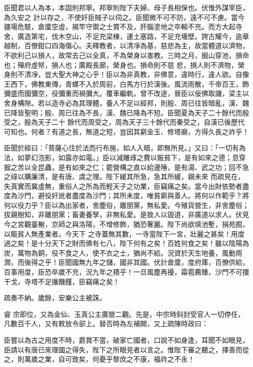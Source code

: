\begin{pinyinscope}
 臣聞君以人為本，本固則邦寧。邦寧則陛下夫婦、母子長相保也。伏惟外謀宰臣，為久安之
 計以存之，不使奸臣賊子以伺之。臣聞微不可不防，遠不可不慮。當今疆場危駭，倉廩空虛，揭竿守禦之士賞不及，肝腦塗地之卒輸不充。而方大起寺舍，廣造第宅，伐木空山，不足充梁棟，運土塞路，不足充墻壁。誇古耀今，逾章越制，百僚鉗口四海傷心。夫釋教者，以清凈為基，慈悲為主，故當體道以濟物，不欲利己以損人，故常去己以全真，不為榮身以害教。三時之月，掘山穿池，損命也；殫府虛帑，損人也；廣殿長廊，榮身也。損命則不慈
 悲，損人則不濟物，榮身則不清凈，豈大聖大神之心乎！臣以為非真教，非佛意，違時行，違人欲。自像王西下，佛教東傳，青螺不入於周前，白馬方行於漢後。風流雨散，千帝百王，飾彌盛而國彌空，役彌重而禍彌大。覆車繼軌，曾不改途，晉臣以佞佛取譏，梁主以舍身構隙。若以造寺必為其理體，養人不足以經邦，則殷、周已往皆暗亂，漢、魏已降皆聖明；殷、周已往為不長，漢、魏已降為不短。臣聞夏為天子二十餘代而殷受之，殷為天子二十
 餘代而周受之，周為天子三十餘代而秦受之，自漢已後歷代可知也。何者？有道之長，無道之短，豈因其窮金玉、修塔廟，方得久長之祚乎！



 臣聞於經曰：「菩薩心住於法而行布施，如人入暗，即無所見。」又曰：「一切有為法，如夢幻泡影，如露亦如電。」臣以減雕琢之費以賑貧下，是有如來之德；息穿掘之苦以全昆蟲，是有如來之仁；罷營構之直以給邊陲，是有湯、武之功；回不急之祿以購廉清，是有唐、虞之理。陛下緩其所急，急其所緩，親未來
 而疏見在，失真實而冀虛無，重俗人之所為而輕天子之功業，臣竊痛之矣。當今出財依勢者盡度為沙門，避役奸訛者盡度為沙門；其所未度，唯貧窮與善人。將何以作範乎？將何以役力乎？臣以為出家者，舍塵俗，離朋黨，無私愛。今殖貨營生，非舍塵俗；拔親樹知，非離朋黨；畜妻養孥，非無私愛。是致人以毀道，非廣道以求人。伏見今之宮觀臺榭，京師之與洛陽，不增修飾，猶恐奢麗。陛下尚欲填池塹，捐苑囿，以賑貧人無產業者。今天下
 之寺蓋無其數，一寺當陛下一宮，壯麗之甚矣！用度過之矣！是十分天下之財而佛有七八，陛下何有之矣！百姓何食之矣！雖以陰陽為炭，萬物為銅，役不食之人，使不衣之士，猶尚不給。況資於天生地養，風動雨潤，而後得之乎！臣聞國無九年之儲，國非其國。伏計倉廩，度府庫，百僚供給，百事用度，臣恐卒歲不充，況九年之積乎！一旦風塵再擾，霜雹薦臻，沙門不可擐干戈，寺塔不足攘饑饉，臣竊痛之矣！



 疏奏不納。歲餘，安樂公主被誅。



 睿
 宗即位，又為金仙、玉真公主廣營二觀。先是，中宗時斜封受官人一切停任，凡數百千人，又有敕放令卻上。替否時為左補闕，又上疏陳時政曰：



 臣嘗以為古之用度不時，爵賞不當，破家亡國者，口說不如身逢，耳聞不如眼見，臣請以有唐已來理國之得失，陛下之所眼見者以言之。惟陛下審之聽之，擇善而從之，則萬歲之業，自可致矣，何憂乎黎庶之不康，福祚之不永！




\end{pinyinscope}
